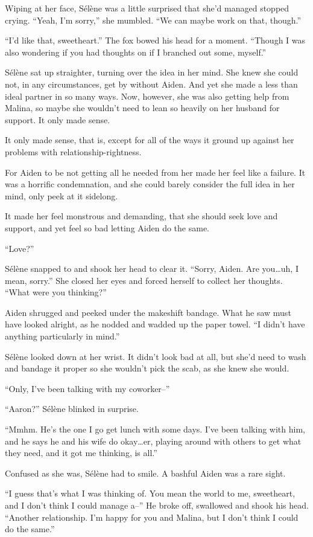 Wiping at her face, Sélène was a little surprised that she'd managed stopped crying. ``Yeah, I'm sorry,'' she mumbled. ``We can maybe work on that, though.''

``I'd like that, sweetheart.'' The fox bowed his head for a moment. ``Though I was also wondering if you had thoughts on if I branched out some, myself.''

Sélène sat up straighter, turning over the idea in her mind. She knew she could not, in any circumstances, get by without Aiden. And yet she made a less than ideal partner in so many ways. Now, however, she was also getting help from Malina, so maybe she wouldn't need to lean so heavily on her husband for support. It only made sense.

It only made sense, that is, except for all of the ways it ground up against her problems with relationship-rightness.

For Aiden to be not getting all he needed from her made her feel like a failure. It was a horrific condemnation, and she could barely consider the full idea in her mind, only peek at it sidelong.

It made her feel monstrous and demanding, that she should seek love and support, and yet feel so bad letting Aiden do the same.

``Love?''

Sélène snapped to and shook her head to clear it. ``Sorry, Aiden. Are you\ldots{}uh, I mean, sorry.'' She closed her eyes and forced herself to collect her thoughts. ``What were you thinking?''

Aiden shrugged and peeked under the makeshift bandage. What he saw must have looked alright, as he nodded and wadded up the paper towel. ``I didn't have anything particularly in mind.''

Sélène looked down at her wrist. It didn't look bad at all, but she'd need to wash and bandage it proper so she wouldn't pick the scab, as she knew she would.

``Only, I've been talking with my coworker--''

``Aaron?'' Sélène blinked in surprise.

``Mmhm. He's the one I go get lunch with some days. I've been talking with him, and he says he and his wife do okay\ldots{}er, playing around with others to get what they need, and it got me thinking, is all.''

Confused as she was, Sélène had to smile. A bashful Aiden was a rare sight.

``I guess that's what I was thinking of. You mean the world to me, sweetheart, and I don't think I could manage a--'' He broke off, swallowed and shook his head. ``Another relationship. I'm happy for you and Malina, but I don't think I could do the same.''

